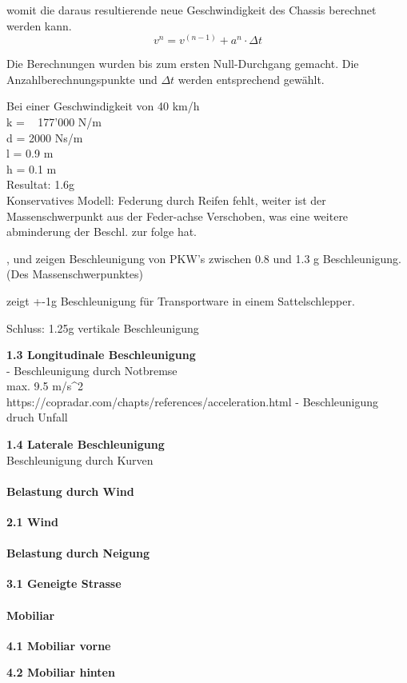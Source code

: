 \begin{description}
  womit die daraus resultierende neue Geschwindigkeit des Chassis berechnet werden kann.
  \begin{equation}
    v^n = v^{(n-1)} + a^n \cdot \Delta t
  \end{equation}

  Die Berechnungen wurden bis zum ersten Null-Durchgang gemacht. Die Anzahlberechnungspunkte und $\Delta t$ werden entsprechend gewählt.

  Bei einer Geschwindigkeit von 40 km/h\\
  k = ~ 177'000 N/m\\
  d = 2000 Ns/m\\
  l = 0.9 m\\
  h = 0.1 m\\
  Resultat: 1.6g\\
  Konservatives Modell: Federung durch Reifen fehlt, weiter ist der Massenschwerpunkt aus der Feder-achse Verschoben, was eine weitere abminderung der Beschl. zur folge hat.

  \cite{Beschl.1}, \cite{Beschl.2} und \cite{Beschl.3} zeigen Beschleunigung von PKW's zwischen 0.8 und 1.3 g Beschleunigung. (Des Massenschwerpunktes)

  \cite{Beschl.4} zeigt +-1g Beschleunigung für Transportware in einem Sattelschlepper.

  Schluss: 1.25g vertikale Beschleunigung



  \item \textbf{1.3 Longitudinale Beschleunigung}\\
  - Beschleunigung durch Notbremse\\
  \cite{Verz.1} max. 9.5 m/s^2\\
  https://copradar.com/chapts/references/acceleration.html
  - Beschleunigung druch Unfall\\
  \item \textbf{1.4 Laterale Beschleunigung}\\
  Beschleunigung durch Kurven
\end{description}

\paragraph{Belastung durch Wind}
\begin{description}
  \item \textbf{2.1 Wind}
\end{description}

\paragraph{Belastung durch Neigung}
\begin{description}
  \item \textbf{3.1 Geneigte Strasse}
\end{description}

\paragraph{Mobiliar}
\begin{description}
  \item \textbf{4.1 Mobiliar vorne}
  \item \textbf{4.2 Mobiliar hinten}
\end{description}
